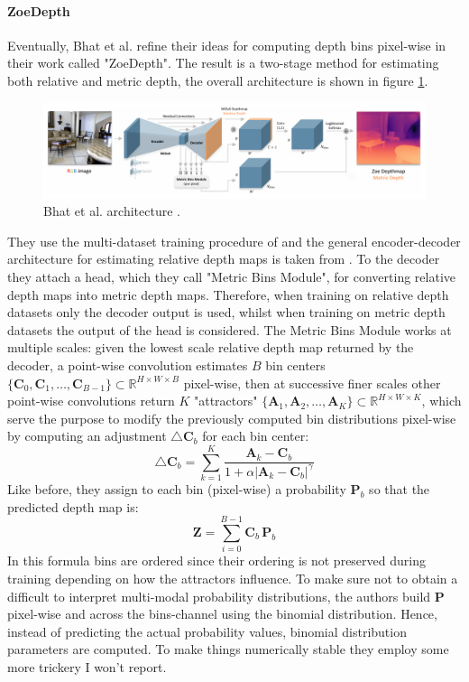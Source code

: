 \paragraph{ZoeDepth} Eventually, Bhat et al. \cite{ZoeDepth} refine their ideas for computing depth bins pixel-wise in their work called "ZoeDepth".
The result is a two-stage method for estimating both relative and metric depth, the overall architecture is shown in figure \ref{fig:zoe_depth}.

\begin{figure}
	\centering
	\includegraphics[scale=0.3]{figs/zoe_depth}
	\caption{Bhat et al. architecture \cite{ZoeDepth}. \label{fig:zoe_depth}}
\end{figure}

They use the multi-dataset training procedure of \cite{MiDas} and the general encoder-decoder architecture for estimating relative depth maps is taken from \cite{denseViT}.
To the decoder they attach a head, which they call "Metric Bins Module", for converting relative depth maps into metric depth maps.
Therefore, when training on relative depth datasets only the decoder output is used, whilst when training on metric depth datasets the output of the head is considered.
The Metric Bins Module works at multiple scales: given the lowest scale relative depth map returned by the decoder, a point-wise convolution estimates $B$ bin centers $\{\mathbf{C}_{0}, \mathbf{C}_{1}, \dotsc, \mathbf{C}_{B-1}\} \subset \mathbb{R}^{H \times W \times B}$ pixel-wise, then at successive finer scales other point-wise convolutions return $K$ "attractors" $\{\mathbf{A}_{1}, \mathbf{A}_{2}, \dotsc, \mathbf{A}_{K}\} \subset \mathbb{R}^{H \times W \times K}$, which serve the purpose to modify the previously computed bin distributions pixel-wise by computing an adjustment $\triangle \mathbf{C}_{b}$ for each bin center:
\[
	\triangle \mathbf{C}_{b} = \sum_{k=1}^{K} \frac{\mathbf{A}_{k} - \mathbf{C}_{b}}{1 + \alpha | \mathbf{A}_{k} - \mathbf{C}_{b} |^{\gamma}}
\]
Like before, they assign to each bin (pixel-wise) a probability $\mathbf{P}_{b}$ so that the predicted depth map is:
\[
	\mathbf{Z} = \sum_{i=0}^{B-1} \mathbf{C}_{b} \, \mathbf{P}_{b}
\]
In this formula bins are ordered since their ordering is not preserved during training depending on how the attractors influence.
To make sure not to obtain a difficult to interpret multi-modal probability distributions, the authors build $\mathbf{P}$ pixel-wise and across the bins-channel using the binomial distribution.
Hence, instead of predicting the actual probability values, binomial distribution parameters are computed.
To make things numerically stable they employ some more trickery I won't report.